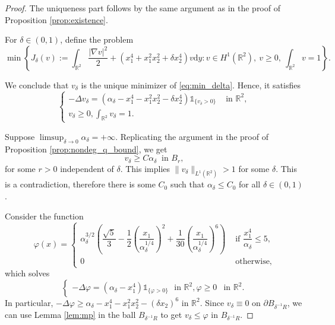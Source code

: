 \documentclass[10pt,a4paper]{amsart}
\newcommand{\RR}{\mathbb{R}}
\newcommand{\faskip}{\hspace{8pt}}
\begin{document}
\begin{proof}
	The uniqueness part follows by the same argument as in the proof of Proposition \ref{prop:existence}.

	For $ \delta \in (0,1) $, define the problem
	\begin{equation}
	\label{eq:min_delta}
		\min \left\{ J_{\delta}(v) := \int_{\RR^{2}} \frac{|\nabla v|^{2}}{2} + \left( x_1^{4} + x_1^{2}x_2^{2} + \delta x_2^{4} \right)  v \mathrm{d}y: v\in H^{1}(\RR^{2}),~ v\geq 0, ~ \int_{\RR^{2}}v = 1  \right\}.
	\end{equation}

	We conclude that $ v_{\delta} $ is the unique minimizer of \eqref{eq:min_delta}. Hence, it satisfies
	\begin{equation}
		\label{eq:obstacle_delta}
		\begin{cases}
			-\Delta v_{\delta} = \left( \alpha_{\delta} - x_1^{4} - x_1^{2}x_2^{2} - \delta x_2^{4}	\right)\mathbb{1}_{\{v_{\delta} > 0 \}} & \text{ in }\RR^{2},\\
			v_{\delta} \geq 0, \int_{\RR^{2}}v_{\delta} = 1. &
		\end{cases}
	\end{equation}
	
	Suppose $ \limsup_{\delta \rightarrow 0}\alpha_{\delta} = +\infty $. Replicating the argument in the proof of Proposition \ref{prop:nondeg_q_bound}, we get 
	\begin{equation}
		\label{eq:inf_noncoercive}
		v_{\delta} \geq C\alpha_{\delta} ~\text{ in }B_r,
	\end{equation}
for some $ r > 0 $ independent of $ \delta $. This implies $ \|v_{\delta} \|_{L^{1}(\RR^{2})} > 1$ for some $ \delta $. This is a contradiction, therefore there is some $ C_0 $ such that $ \alpha_{\delta} \leq C_0 $ for all $ \delta \in (0,1) $. 

	Consider the function
	\[\varphi(x) = \begin{cases}
		\alpha_{\delta}^{3/2} \left( \dfrac{\sqrt{5}}{3} - \dfrac{1}{2} \left( \dfrac{x_1}{\alpha_{\delta}^{1/4}} \right)^{2} +\dfrac{1}{30} \left( \dfrac{x_1}{\alpha_{\delta}^{1/4}} \right)^{6}\right) & \text{ if }  \dfrac{x_1^{4}}{\alpha_{\delta}} \leq 5, \\
		0 & \text{ otherwise,}
	\end{cases}\]
which solves 
	\[
		\begin{cases}
			-\Delta \varphi = \left( \alpha_{\delta} - x_1^{4} \right) \mathbb{1}_{\{\varphi > 0\}} \faskip \text{in } \RR^{2},
			\varphi \geq 0 & \text{in }\RR^{2}.
		\end{cases}
	\]
	In particular, $ -\Delta \varphi \geq \alpha_{\delta} - x_1^{4} - x_1^{2}x_2^{2} - (\delta x_2)^{6} $ in $ \RR^{2} $. Since $ v_{\delta} \equiv 0 $ on $ \partial B_{\delta^{-1} R} $, we can use Lemma \ref{lem:mp} in the ball $ B_{\delta^{-1}R} $ to get $ v_{\delta} \leq \varphi $ in $ B_{\delta^{-1}R} $. 


\end{proof}
\end{document}
